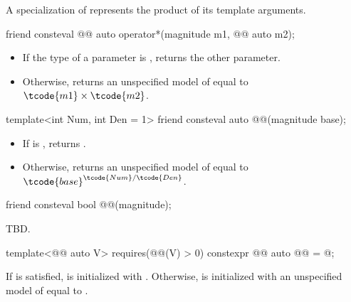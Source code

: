 \pnum
A specialization of 
represents the product of its template arguments.

\begin{itemdecl}
friend consteval @@ auto operator*(magnitude m1, @@ auto m2);
\end{itemdecl}

\begin{itemdescr}
\pnum
\returns
\begin{itemize}
\item
If the type of a parameter is , returns the other parameter.
\item
Otherwise, returns an unspecified model of  equal to $\tcode{m1} \times \tcode{m2}$.
\end{itemize}
\end{itemdescr}

\begin{itemdecl}
template<int Num, int Den = 1>
friend consteval auto @@(magnitude base);
\end{itemdecl}

\begin{itemdescr}
\pnum
\returns
\begin{itemize}
\item
If  is , returns .
\item
Otherwise, returns an unspecified model of  equal to $\tcode{base}^{\tcode{Num}/\tcode{Den}}$.
\end{itemize}
\end{itemdescr}

\begin{itemdecl}
friend consteval bool @@(magnitude);
\end{itemdecl}

\begin{itemdescr}
\pnum
\returns
TBD.
\end{itemdescr}

\begin{codeblock}
template<@@ auto V>
  requires(@@(V) > 0)
constexpr @@ auto @@ = @\seebelownc@;
\end{codeblock}

\pnum
If  is satisfied,
 is initialized with .
Otherwise,  is initialized with
an unspecified model of  equal to .


